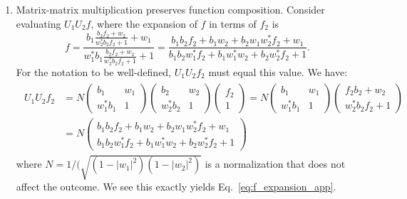 \begin{appendices}
\begin{enumerate}
    \item Matrix-matrix multiplication preserves function composition. Consider evaluating $U_1 U_2 f$, where the expansion of $f$ in terms of $f_2$ is
    \begin{equation}
        f = \frac{b_1 \frac{b_2 f_2 + w_2}{w_2^* b_2 f_2 + 1} + w_1}{ w_1^* b_1 \frac{b_2 f_2 + w_2}{w_2^* b_2 f_2 + 1} + 1} = \frac{b_1 b_2 f_2 + b_1 w_2 + b_2 w_1 w_2^* f_2 + w_1}{b_1 b_2 w_1^* f_2 + b_1 w_1^* w_2 + b_2 w_2^* f_2 + 1}.
        \label{eq:f_expansion_app}
    \end{equation}
    For the notation to be well-defined, $U_1 U_2 f_2$ must equal this value. We have:
    \begin{align}\begin{split}
        U_1 U_2 f_2 &= N \begin{pmatrix}
        b_1 & w_1 \\ w_1^* b_1 & 1
    \end{pmatrix}
    \begin{pmatrix}
        b_2 & w_2 \\ w_2^* b_2 & 1
    \end{pmatrix}
    \begin{pmatrix}
        f_2 \\ 1
    \end{pmatrix}
    = 
    N \begin{pmatrix}
        b_1 & w_1 \\ w_1^* b_1 & 1
    \end{pmatrix} \begin{pmatrix}
        f_2 b_2 + w_2 \\
        w_2^* b_2 f_2 + 1
    \end{pmatrix} \\
    &= N \begin{pmatrix}
        b_1 b_2 f_2 + b_1 w_2 +  b_2 w_1 w_2^* f_2 + w_1 \\
        b_1 b_2 w_1^* f_2  + b_1 w_1^* w_2 + b_2 w_2^* f_2 + 1
    \end{pmatrix}
    \end{split}\end{align}
    where $N = 1 / (\sqrt{(1 - |w_1|^2) (1 - |w_2|^2)}$ is a normalization that does not affect the outcome. We see this exactly yields Eq.~\eqref{eq:f_expansion_app}.


\end{enumerate}
\end{appendices}
